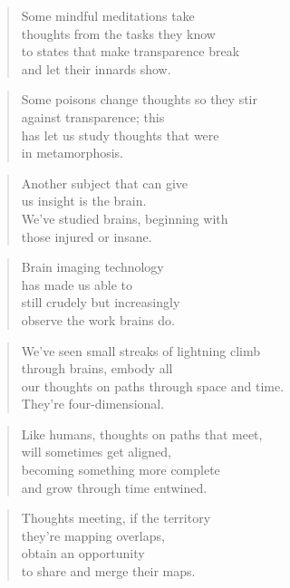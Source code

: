 \documentclass[10pt,a4paper]{article}
\begin{document}
\begin{paracol}{2}
\begin{verse}
Some mindful meditations take\\
thoughts from the tasks they know\\
to states that make transparence break\\
and let their innards show.
\end{verse}

\begin{verse}
Some poisons change thoughts so they stir\\
against transparence; this\\
has let us study thoughts that were\\
in metamorphosis.
\end{verse}

\begin{verse}
Another subject that can give\\
us insight is the brain.\\
We’ve studied brains, beginning with\\
those injured or insane.
\end{verse}

\begin{verse}
Brain imaging technology\\
has made us able to\\
still crudely but increasingly\\
observe the work brains do.
\end{verse}

\begin{verse}
We’ve seen small streaks of lightning climb\\
through brains, embody all\\
our thoughts on paths through space and time.\\
They’re four-dimensional.
\end{verse}

\begin{verse}
Like humans, thoughts on paths that meet,\\
will sometimes get aligned,\\
becoming something more complete\\
and grow through time entwined.
\end{verse}

\begin{verse}
Thoughts meeting, if the territory\\
they’re mapping overlaps,\\
obtain an opportunity\\
to share and merge their maps.
\end{verse}


\end{paracol}
\end{document}
